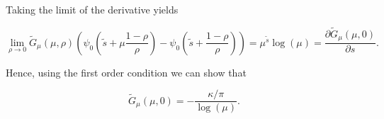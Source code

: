 \documentclass[american, abstract=on]{scrartcl}
\theoremstyle{plain}
\begin{document}
Taking the limit of the derivative yields

\begin{equation}
  \lim_{\rho \rightarrow 0}\tilde{G}_\mu(\mu, \rho) \left(\psi_0\left(\tilde{s} + \mu \frac{1 - \rho}{\rho} \right) - \psi_0\left(\tilde{s} + \frac{1 - \rho}{\rho} \right) \right) = \mu^{\tilde{s}} \log(\mu) = \frac{\partial \tilde{G}_{\mu}(\mu, 0)}{\partial s}.
\end{equation}

Hence, using the first order condition we can show that

\begin{equation}
  \tilde{G}_{\mu}(\mu, 0) = -\frac{\kappa / \pi}{\log(\mu)}.
\end{equation}

\newpage
\nocite{*}
\printbibliography

\newpage
\appendix

\end{document}
